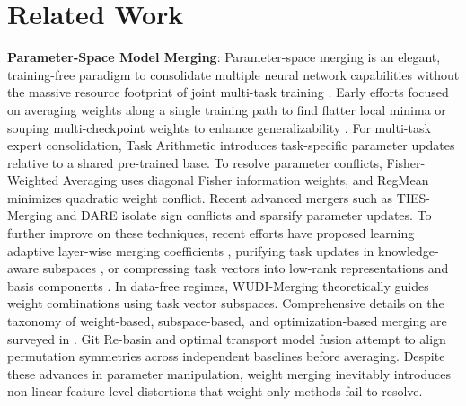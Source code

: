 \documentclass{article}
\theoremstyle{plain}
\theoremstyle{definition}
\begin{document}
\section{Related Work}
\label{sec:related}
\textbf{Parameter-Space Model Merging}: Parameter-space merging is an elegant, training-free paradigm to consolidate multiple neural network capabilities without the massive resource footprint of joint multi-task training \cite{crawshaw2020multi}. Early efforts focused on averaging weights along a single training path to find flatter local minima \cite{izmailov2018averaging} or souping multi-checkpoint weights to enhance generalizability \cite{wortsman2022model}. For multi-task expert consolidation, Task Arithmetic \cite{ilharco2022editing} introduces task-specific parameter updates relative to a shared pre-trained base. To resolve parameter conflicts, Fisher-Weighted Averaging \cite{matena2022merging} uses diagonal Fisher information weights, and RegMean \cite{jin2022raw} minimizes quadratic weight conflict. Recent advanced mergers such as TIES-Merging \cite{yadav2023ties} and DARE \cite{yu2024language} isolate sign conflicts and sparsify parameter updates. To further improve on these techniques, recent efforts have proposed learning adaptive layer-wise merging coefficients \cite{yang2024adamerging}, purifying task updates in knowledge-aware subspaces \cite{an2025purifying}, or compressing task vectors into low-rank representations and basis components \cite{gargiulo2025task, zeng2025task}. In data-free regimes, WUDI-Merging \cite{cheng2025whoever} theoretically guides weight combinations using task vector subspaces. Comprehensive details on the taxonomy of weight-based, subspace-based, and optimization-based merging are surveyed in \cite{yang2024model}. Git Re-basin \cite{ainsworth2022git} and optimal transport model fusion \cite{singh2020model} attempt to align permutation symmetries across independent baselines before averaging. Despite these advances in parameter manipulation, weight merging inevitably introduces non-linear feature-level distortions that weight-only methods fail to resolve.
\end{document}
